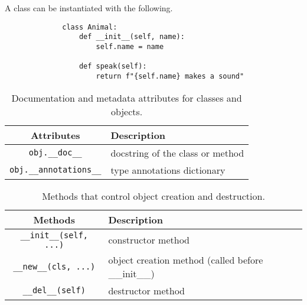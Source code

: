   A class can be instantiated with the following. 

  \begin{example}
    \begin{figure}[H]
      \centering 
      \begin{lstlisting}
        class Animal: 
            def __init__(self, name):
                self.name = name
            
            def speak(self):
                return f"{self.name} makes a sound"
      \end{lstlisting} 
      \caption{} 
      \label{fig:animal_class}
    \end{figure}
  \end{example} 

  \begin{definition}
    \begin{table}[H]
      \centering
      \begin{tabular}{|c|p{8cm}|}
        \hline
        \textbf{Attributes} & \textbf{Description} \\
        \hline 
        \texttt{obj.\_\_doc\_\_} & docstring of the class or method \\
        \hline
        \texttt{obj.\_\_annotations\_\_} & type annotations dictionary \\
        \hline
      \end{tabular}
      \caption{Documentation and metadata attributes for classes and objects.}
      \label{tab:documentation_metadata}
    \end{table}
  \end{definition}

  \begin{definition}
    \begin{table}[H]
      \centering
      \begin{tabular}{|c|p{8cm}|}
        \hline
        \textbf{Methods} & \textbf{Description} \\
        \hline 
        \texttt{\_\_init\_\_(self, ...)} & constructor method \\
        \hline
        \texttt{\_\_new\_\_(cls, ...)} & object creation method (called before \_\_init\_\_) \\
        \hline
        \texttt{\_\_del\_\_(self)} & destructor method \\
        \hline
      \end{tabular}
      \caption{Methods that control object creation and destruction.}
      \label{tab:object_lifecycle}
    \end{table}
  \end{definition}

